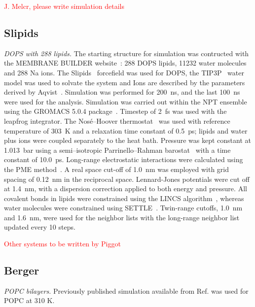 \documentclass[journal=jpcbfk]{achemso}
\newcommand{\todo}[1]{\textcolor{red}{#1}}
\begin{document}
\todo{J. Melcr, please write simulation details} \\

\subsection{Slipids}

\noindent
{\it DOPS with 288 lipids.}
The starting structure for simulation was contructed with the MEMBRANE BUILDER website~\cite{ghahremanpour13}: 288 DOPS lipids, 11232 water molecules and 288 Na ions. The Slipids~\cite{jambeck12,jambeck2012another} forcefield was used for DOPS, the TIP3P~\cite{jorgensen83} water model was used to solvate the system and Ions are described by the parameters derived by Aqvist~\cite{aqvist90}.
Simulation was performed for 200~ns, and the last 100~ns were used for the analysis. Simulation was carried out within the NPT ensemble using the GROMACS 5.0.4 package~\cite{abraham2015gromacs}. Timestep of 2~fs was used with the leapfrog integrator. The Nos\'{e}--Hoover thermostat~\cite{nose84,hoover85} was used with reference temperature of 303~K and a relaxation time constant of 0.5~ps; lipids and water plus ions were coupled separately to the heat bath. Pressure was kept constant at 1.013~bar using a semi--isotropic Parrinello--Rahman
barostat~\cite{parrinello81} with a time constant of 10.0~ps. Long-range electrostatic interactions were calculated using the PME method~\cite{darden93,essman95}. A real space cut-off of 1.0~nm was employed with grid spacing of 0.12~nm in the reciprocal space. Lennard-Jones potentials were cut off at 1.4~nm, with a dispersion correction applied to both energy and pressure. All covalent bonds in lipids were constrained using the LINCS algorithm~\cite{hess97}, whereas water molecules were constrained using SETTLE~\cite{miyamoto92}. Twin-range cutoffs, 1.0~nm and 1.6~nm, were used for the neighbor lists with the long-range neighbor list updated every 10 steps.

\todo{Other systems to be written by Piggot}




\subsection{Berger}
\noindent
{\it POPC bilayers.} 
Previously published simulation \cite{ollila07a} available from Ref. 
was used for POPC at 310 K.
\end{document}

